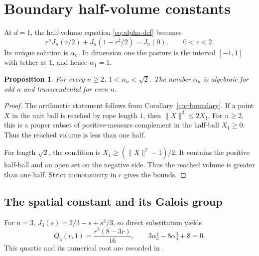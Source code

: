 \documentclass[11pt,a4paper]{article}
\numberwithin{equation}{section}
\newtheorem{proposition}[theorem]{Proposition}
\theoremstyle{definition}
\theoremstyle{remark}
\begin{document}
\section{Boundary half-volume constants}\label{sec:half}

At $d=1$, the half-volume equation \eqref{eq:alpha-def} becomes
\begin{equation}\label{eq:half}
 r^nJ_n(r/2)+J_n(1-r^2/2)=J_n(0),\qquad 0<r<2.
\end{equation}
Its unique solution is $\alpha_n$. In dimension one the pasture is the interval $[-1,1]$ with tether at $1$, and hence $\alpha_1=1$.

\begin{proposition}\label{prop:bounds}
For every $n\geq2$, $1<\alpha_n<\sqrt2$. The number $\alpha_n$ is algebraic for odd $n$ and transcendental for even $n$.
\end{proposition}
\begin{proof}
The arithmetic statement follows from Corollary~\ref{cor:boundary}. If a point $X$ in the unit ball is reached by rope length $1$, then $\|X\|^2\leq2X_1$. For $n\geq2$, this is a proper subset of positive-measure complement in the half-ball $X_1\geq0$. Thus the reached volume is less than one half.

For length $\sqrt2$, the condition is $X_1\geq(\|X\|^2-1)/2$. It contains the positive half-ball and an open set on the negative side. Thus the reached volume is greater than one half. Strict monotonicity in $r$ gives the bounds.
\end{proof}

\subsection{The spatial constant and its Galois group}

For $n=3$, $J_3(s)=2/3-s+s^3/3$, so direct substitution yields
\begin{equation}\label{eq:spatial}
 Q_3(r,1)=\frac{r^3(8-3r)}{16},\qquad
 3\alpha_3^4-8\alpha_3^3+8=0.
\end{equation}
This quartic and its numerical root are recorded in \cite{OEIS3}.
\end{document}
